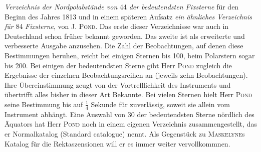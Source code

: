 \emph{Verzeichnis der Nordpolabstände von} 44 \emph{der bedeutendsten Fixsterne} für den Beginn des Jahres 1813 und in einem späteren Aufsatz \emph{ein ähnliches Verzeichnis für} 84 \emph{Fixsterne}, von J. \textsc{Pond}. Das erste dieser Verzeichnisse war auch in Deutschland schon früher bekannt geworden. Das zweite ist als erweiterte und verbesserte Ausgabe anzusehen. Die Zahl der Beobachtungen, auf denen diese Bestimmungen beruhen, reicht bei einigen Sternen bis 100, beim Polarstern sogar bis 200. Bei einigen der bedeutendsten Sterne gibt Herr \textsc{Pond} zugleich die Ergebnisse der einzelnen Beobachtungsreihen an (jeweils zehn Beobachtungen). Ihre Übereinstimmung zeugt von der Vortrefflichkeit des Instruments und übertrifft alles bisher in dieser Art Bekannte. Bei vielen Sternen hielt Herr \textsc{Pond} seine Bestimmung bis auf $\frac{1}{4}$ Sekunde für zuverlässig, soweit sie allein vom Instrument abhängt. Eine Auswahl von 30 der bedeutendsten Sterne nördlich des Äquators hat Herr \textsc{Pond} noch in einem eigenen Verzeichnis zusammengestellt, das er Normalkatalog (Standard catalogue) nennt. Als Gegenstück zu \textsc{Maskelyne}s Katalog für die Rektaszensionen will er es immer weiter vervollkommnen.

